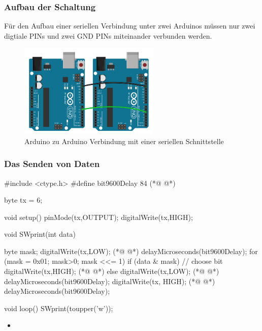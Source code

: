 \subsubsection{Aufbau der Schaltung}
Für den Aufbau einer seriellen Verbindung unter zwei Arduinos müssen nur zwei digtiale PINs und zwei GND PINs miteinander verbunden werden.
\begin{figure}[h]
  \begin{center}
    \includegraphics[width=0.6\textwidth]{Anhang/Bilder/arduino-to-arduino.png}
  \end{center}
  \label{fig:arduino-to-arduino}
  \caption{Arduino zu Arduino Verbindung mit einer seriellen Schnittstelle}
\end{figure}
  
\subsubsection{Das Senden von Daten}

\begin{multicols}{2}
\begin{arduinoCode}{}{}
#include <ctype.h>
#define bit9600Delay 84 (*@  @*)  

byte tx = 6;

void setup() {
  pinMode(tx,OUTPUT);
  digitalWrite(tx,HIGH);
}

void SWprint(int data)
{
  byte mask;
  digitalWrite(tx,LOW); (*@  @*)
  delayMicroseconds(bit9600Delay); 
  for (mask = 0x01; mask>0; mask <<= 1) {
    if (data & mask){ // choose bit
     digitalWrite(tx,HIGH); (*@  @*)
    }
    else{
     digitalWrite(tx,LOW); (*@  @*)
    }
    delayMicroseconds(bit9600Delay);
  }
  digitalWrite(tx, HIGH); (*@  @*)
  delayMicroseconds(bit9600Delay);  
 
}

void loop()
{
    SWprint(toupper('w'));      
}
\end{arduinoCode}

\vfill
\columnbreak

\begin{itemize}
  \itemsep15pt
  \item[] 
\end{itemize}


\vfill 
\end{multicols}


